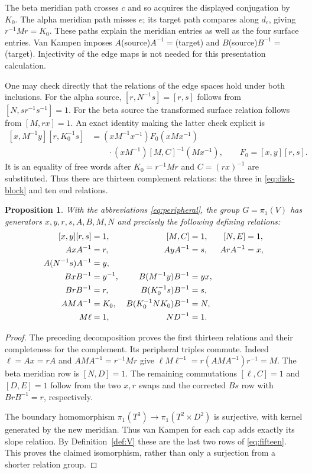 \documentclass[11pt]{amsart}
\newtheorem{proposition}[theorem]{Proposition}
\theoremstyle{definition}
\theoremstyle{remark}
\begin{document}
The beta meridian path crosses $c$ and so acquires the displayed
conjugation by $K_0$. The alpha meridian path misses $e$; its
target path compares along $d_c$, giving $r^{-1}Mr=K_0$.
These paths explain the meridian entries as well as the four
surface entries. Van Kampen imposes $A$(source)$A^{-1}=$(target)
and $B$(source)$B^{-1}=$(target). Injectivity of the edge maps is
not needed for this presentation calculation.

One may check directly that the relations of the edge spaces hold
under both inclusions. For the alpha source,
$[r,N^{-1}s]=[r,s]$ follows from $[N,sr^{-1}s^{-1}]=1$.
For the beta source the transformed surface relation follows from
$[M,rx]=1$. An exact identity making the latter check explicit is
\begin{equation}\label{eq:cross-surface}
 \begin{split}
 [x,M^{-1}y][r,K_0^{-1}s]
   &=(xM^{-1}x^{-1})F_0(xMx^{-1})\\
   &\qquad\cdot(xM^{-1})[M,C]^{-1}(Mx^{-1}),
       \qquad F_0=[x,y][r,s].
 \end{split}
\end{equation}
It is an equality of free words after $K_0=r^{-1}Mr$ and
$C=(rx)^{-1}$ are substituted. Thus there are thirteen complement
relations: the three in \eqref{eq:disk-block} and ten end relations.

\begin{proposition}\label{prop:fifteen}
With the abbreviations \eqref{eq:peripheral}, the group
$G=\pi_1(V)$ has generators $x,y,r,s,A,B,M,N$ and precisely the
following defining relations:
\begin{equation}\label{eq:fifteen}
\begin{aligned}
 \relax[x,y][r,s]&=1,& [M,C]&=1,&[N,E]&=1,\\
 AxA^{-1}&=r,&AyA^{-1}&=s,&ArA^{-1}&=x,\\
 A(N^{-1}s)A^{-1}&=y,\\
 BxB^{-1}&=y^{-1},&B(M^{-1}y)B^{-1}&=yx,\\
 BrB^{-1}&=r,&B(K_0^{-1}s)B^{-1}&=s,\\
 AMA^{-1}&=K_0,&B(K_0^{-1}NK_0)B^{-1}&=N,\\
 M\ell&=1,&ND^{-1}&=1.
\end{aligned}
\end{equation}
\end{proposition}
\begin{proof}
The preceding decomposition proves the first thirteen relations and
their completeness for the complement. Its peripheral triples
commute. Indeed $\ell=Ax=rA$ and $AMA^{-1}=r^{-1}Mr$ give
$\ell M\ell^{-1}=r(AMA^{-1})r^{-1}=M$.
The beta meridian row is $[N,D]=1$. The remaining commutations
$[\ell,C]=1$ and $[D,E]=1$ follow from the two $x,r$ swaps and
the corrected $Bs$ row with $BrB^{-1}=r$, respectively.

The boundary homomorphism $\pi_1(T^3)\to\pi_1(T^2\times D^2)$
is surjective, with kernel generated by the new meridian. Thus
van Kampen for each cap adds exactly its slope relation. By
Definition~\ref{def:V} these are the last two rows of
\eqref{eq:fifteen}. This proves the claimed isomorphism, rather
than only a surjection from a shorter relation group.
\end{proof}
\end{document}

